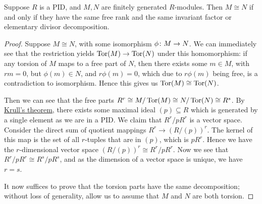 \begin{theorem}\label{thm:structure-uniqueness}
    Suppose \(R\) is a PID,
    and \(M,N\) are finitely generated \(R\)-modules.
    Then \(M \cong N\) if and only if they have the same free rank
    and the same invariant factor or elementary divisor decomposition.
\end{theorem}
\begin{proof}
    Suppose \(M \cong N\), with some isomorphism \(\phi\colon M\to N\).
    We can immediately see that the restriction yields
    \(\operatorname{Tor}(M) \to \operatorname{Tor}(N)\) under this homomorphism:
    if any torsion of \(M\) maps to a free part of \(N\),
    then there exists some \(m \in M\), with \(rm = 0\),
    but \(\phi(m) \in N\), and \(r\phi(m) = 0\),
    which due to \(r\phi(m)\) being free, is a contradiction to isomorphism.
    Hence this gives us \(\operatorname{Tor}(M) \cong \operatorname{Tor}(N)\).

    Then we can see that the free parts
    \(R^r \cong M/\operatorname{Tor}(M) \cong N/\operatorname{Tor}(N) \cong R^s\).
    By \hyperref[thm:krull]{Krull's theorem},
    there exists some maximal ideal \((p) \subseteq R\)
    which is generated by a single element as we are in a PID.\@
    We claim that \(R^r/pR^r\) is a vector space.
    Consider the direct sum of quotient mappings \(R^r \to {(R/(p))}^r\).
    The kernel of this map is the set of all \(r\)-tuples that are in \((p)\),
    which is \(pR^r\).
    Hence we have the \(r\)-dimensional vector space \({(R/(p))}^r \cong R^r/pR^r\).
    Now we see that \(R^r/pR^r \cong R^s/pR^s\),
    and as the dimension of a vector space is unique,
    we have \(r = s\).

    It now suffices to prove that the torsion parts have the same decomposition;
    without loss of generality,
    allow us to assume that \(M\) and \(N\) are both torsion.


\end{proof}
